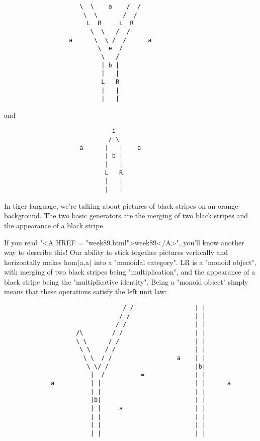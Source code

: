 \begin{verbatim}
                     \  \    a    /  /  
                      \  \       /  /
                       L  R     L  R
                        \  \   /  /
                  a      \  \ /  /      a
                          \  e  /
                           \   /
                           | b |
                           |   |
                           L   R
                           |   |
                           |   |   
\end{verbatim}
    
and
\begin{verbatim}
                              i
                             / \
                     a      |   |    a
                            | b |     
                            |   |
                            L   R   
                            |   |
                            |   |
\end{verbatim}
    
In tiger language, we're talking about pictures of black stripes on an
orange background.  The two basic generators are the merging of two
black stripes and the appearance of a black stripe.  

If you read "<A HREF = "week89.html">week89</A>", you'll know
another way to describe this!  Our ability to stick together pictures
vertically and horizontally makes hom(a,a) into a "monoidal
category".  LR is a "monoid object", with merging of two
black stripes being "multiplication", and the appearance of a
black stripe being the "multiplicative identity".  Being a
"monoid object" simply means that these operations satisfy the
left unit law:


\begin{verbatim}
                                 / /                 | |
                                / /                  | |
                               / /                   | |
                    /\        / /                    | |
                    \ \      / /                     | |
                     \ \    / /                      | |
                      \ \  / /                  a    | |
                       \ \/ /                        |b|
                        |  /          =              | |
             a          | |                          | |      a
                        | |                          | |
                        |b|                          | |
                        | |     a                    | |
                        | |                          | |
                        | |                          | |
                        | |                          | |
\end{verbatim}
    
